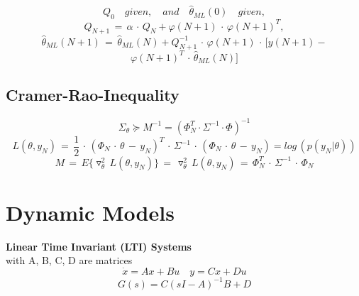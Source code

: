\begin{equation*}
Q_{ 0 }\quad given,\quad and\quad \hat { \theta  } _{ ML }(0)\quad given,
\end{equation*}
\begin{equation*}
Q_{ N+1 }\, =\, \alpha \, \cdot \, Q_{ N }+\varphi (N+1)\, \cdot \, \varphi (N+1)^{ T },
\end{equation*}
\begin{equation*}
\hat { \theta  } _{ ML }(N+1)\, =\, \hat { \theta  } _{ ML }(N)+Q_{ N+1 }^{ -1 }\, \cdot \, \varphi (N+1)\, \cdot \, [y(N+1)-
\end{equation*}
\begin{equation*}
\varphi(N+1)^T \, \cdot \,\hat{\theta}_{ML}(N)]
\end{equation*}

\subsection*{Cramer-Rao-Inequality}
\begin{equation*}
{ \Sigma  }_{ \theta  } \succeq M^{-1} = (\Phi^T_N \cdot \Sigma^{-1} \cdot \Phi)^{-1}
\end{equation*}
\begin{equation*}
L(\theta ,y_{ N })\, =\, \frac { 1 }{ 2 } \, \cdot \, (\Phi _{ N }\, \cdot \, \theta \, -\, y_N)^{ T } \, \cdot \, \Sigma^{-1} \, \cdot \,  (\Phi_N \, \cdot \, \theta \, - \, y_N) =log\, (p({ y }_{ N }|\theta))
\end{equation*}
\begin{equation*}
M\, =\, { E }\{ \triangledown ^{ 2 }_{ \theta  }\, L(\theta ,y_{ N })\} \, =\, \triangledown ^{ 2 }_{ \theta  }\, L(\theta ,y_{ N })\, =\, \Phi _{ N }^{ T }\, \cdot \, \Sigma ^{ -1 }\, \cdot \, \Phi _{ N }
\end{equation*}

\section*{Dynamic Models}
\textbf{Linear Time Invariant (LTI) Systems}\\
with A, B, C, D are matrices
\begin{equation*}
\dot { x } =Ax+Bu \quad y=Cx+Du 
\end{equation*}
\begin{equation*}
G(s)=C{ (sI-A) }^{ -1 }B+D
\end{equation*}

